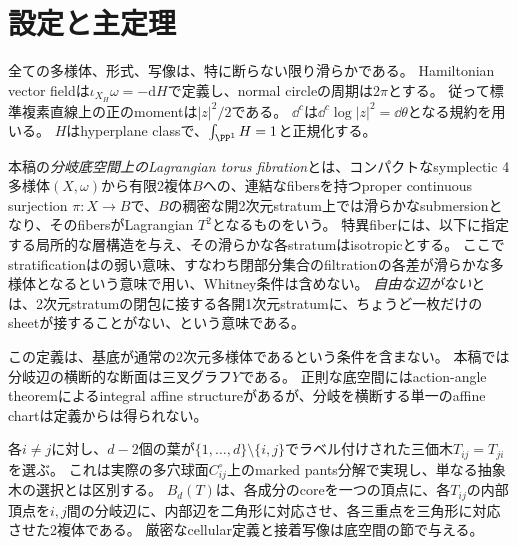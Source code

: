 \section{設定と主定理}\label{sec:main}

全ての多様体、形式、写像は、特に断らない限り滑らかである。
Hamiltonian vector fieldは$\iota_{X_H}\omega=-\mathrm dH$で定義し、normal circleの周期は$2\pi$とする。
従って標準複素直線上の正のmomentは$|z|^2/2$である。
$\dd^c$は$\dd^c\log|z|^2=\dd\theta$となる規約を用いる。
$H$はhyperplane classで、$\int_{\PP^1}H=1$と正規化する。

\begin{definition}\label{def:fibration}
本稿の\emph{分岐底空間上のLagrangian torus fibration}とは、コンパクトなsymplectic 4多様体$(X,\omega)$から有限2複体$B$への、連結なfibersを持つproper continuous surjection $\pi:X\to B$で、$B$の稠密な開2次元stratum上では滑らかなsubmersionとなり、そのfibersがLagrangian $T^2$となるものをいう。
特異fiberには、以下に指定する局所的な層構造を与え、その滑らかな各stratumはisotropicとする。
ここでstratificationは\cite[Definition 2.1]{EM}の弱い意味、すなわち閉部分集合のfiltrationの各差が滑らかな多様体となるという意味で用い、Whitney条件は含めない。
\emph{自由な辺がない}とは、2次元stratumの閉包に接する各開1次元stratumに、ちょうど一枚だけのsheetが接することがない、という意味である。
\end{definition}

この定義は、基底が通常の2次元多様体であるという条件を含まない。
本稿では分岐辺の横断的な断面は三叉グラフ$Y$である。
正則な底空間にはaction-angle theoremによるintegral affine structureがあるが、分岐を横断する単一のaffine chartは定義からは得られない。

各$i\ne j$に対し、$d-2$個の葉が$\{1,\ldots,d\}\setminus\{i,j\}$でラベル付けされた三価木$T_{ij}=T_{ji}$を選ぶ。
これは実際の多穴球面$C_{ij}^{\circ}$上のmarked pants分解で実現し、単なる抽象木の選択とは区別する。
$B_d(T)$は、各成分のcoreを一つの頂点に、各$T_{ij}$の内部頂点を$i,j$間の分岐辺に、内部辺を二角形に対応させ、各三重点を三角形に対応させた2複体である。
厳密なcellular定義と接着写像は底空間の節で与える。


